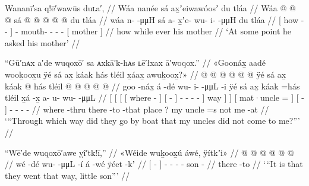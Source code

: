 \ex\label{ex:91-200-asked-mother}%
%
\begingl
	\glpreamble	Wananī′sa q!ē′wawūs duʟa′, //
	\glpreamble	Wáa nanée sá ax̱ʼeiwawóosʼ du tláa //
	\gla	{} Wáa  @ {} @ {} @ {} {} sá
		 @ {} @ {} @ {} @ {} @ {}
		{} du tláa {} //
	\glb	{} wáa n-  -μμH {} {} sá
		a- x̱ʼe- wu- i-  -μμH
		{} du tláa {} //
	\glc	{}[ how -  - \· {}] 
		- mouth- - -  -
		{}[  mother {}] //
	\gld	{} how  {} {} \·while {} ever
		 {} {} {} {} {}
		{} his mother {} //
	\glft	‘At some point he asked his mother’
		//
\endgl
\xe

\ex\label{ex:91-201-where-uncles-went}%
%
\begingl
	\glpreamble	“Gū′nᴀx a′de wuqoxō′ sa ᴀxkā′k-hᴀs ʟē′łxax ā′woqox.” //
	\glpreamble	«\!Goonáx̱ aadé wooḵoox̱u ÿé sá ax̱ káak hás tléil x̱áax̱ awuḵoox̱?\!» //
	\gla	{} {} {} {}  @ {} {}
			{}  @ {} {}
			 @ {} @ {} @ {} @ {} {} ÿé {} sá {}
		{} ax̱ káak @ \•hás {}
		tléil {}  @ {} {}
		 @ {} @ {} @ {} @ {} //
	\glb	{} {} {} {} goo -náx̱ {}
			{} á -dé {}
			wu- i-  -μμL -i {} ÿé {} sá {}
		{} ax̱ káak =hás {}
		tléil {} x̱á -x̱ {}
		a- u- wu-  -μμL //
	\glc	{}[ {}[ {}[ {}[ where - {}]
			{}[  - {}]
			- -  - - {}]
			way {}]  {}]
		{}[  mat·uncle = {}]
		 {}[  - {}]
		- - -  - //
	\gld	{} {} {} {} where -thru {}
			{} there -to {}
			 {} {} {} -that {} place {} ? {}
		{} my uncle =s {}
		not {} me -at {}
		 {} {} {} {} //
	\glft	‘“Through which way did they go by boat that my uncles did not come to me?”’
		//
\endgl
\xe


\ex\label{ex:91-202-thattaway}%
%
\begingl
	\glpreamble	“Wē′de wuqoxō′awe ỵî′tk!ī,” //
	\glpreamble	«\!Wéide wuḵoox̱ú áwé, ÿítkʼi\!» //
	\gla	{}  @ {} {}
		 @ {} @ {} @ {}
		 @ {}
		 @ {} //
	\glb	{} wé -dé {}
		wu-  -μμL -í
		á -wé
		ÿéet -kʼ //
	\glc	{}[  - {}]
		-  - -
		 -
		son - //
	\gld	{} there -to {}
		 {} {} {} //
	\glft	‘“It is that they went that way, little son”’
		//
\endgl
\xe

